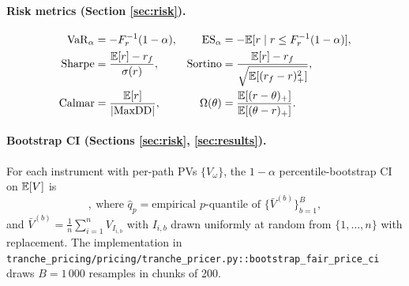 \paragraph{Risk metrics (Section \ref{sec:risk}).}
\begin{align*}
\operatorname{VaR}_\alpha &= -F_r^{-1}(1 - \alpha),
& \operatorname{ES}_\alpha &= -\mathbb{E}[r \mid r \le F_r^{-1}(1 - \alpha)], \\
\text{Sharpe} &= \frac{\mathbb{E}[r] - r_f}{\sigma(r)},
& \text{Sortino} &= \frac{\mathbb{E}[r] - r_f}{\sqrt{\mathbb{E}[(r_f - r)_+^2]}}, \\
\text{Calmar} &= \frac{\mathbb{E}[r]}{|\mathrm{MaxDD}|},
& \Omega(\theta) &= \frac{\mathbb{E}[(r - \theta)_+]}{\mathbb{E}[(\theta - r)_+]}.
\end{align*}

\paragraph{Bootstrap CI (Sections \ref{sec:risk}, \ref{sec:results}).}
For each instrument with per-path PVs $\{V_\omega\}$, the
$1 - \alpha$ percentile-bootstrap CI on $\mathbb{E}[V]$ is
\begin{equation*}
[\hat q_{\alpha/2}, \hat q_{1 - \alpha/2}],\
\text{where } \hat q_p = \text{empirical } p\text{-quantile of }\bigl\{\bar V^{(b)}\bigr\}_{b = 1}^{B},
\end{equation*}
and $\bar V^{(b)} = \frac{1}{n}\sum_{i=1}^n V_{I_{i,b}}$ with
$I_{i,b}$ drawn uniformly at random from $\{1, \ldots, n\}$ with
replacement. The implementation in
\texttt{tranche\_pricing/pricing/tranche\_pricer.py::bootstrap\_fair\_price\_ci}
draws $B = 1\,000$ resamples in chunks of 200.
